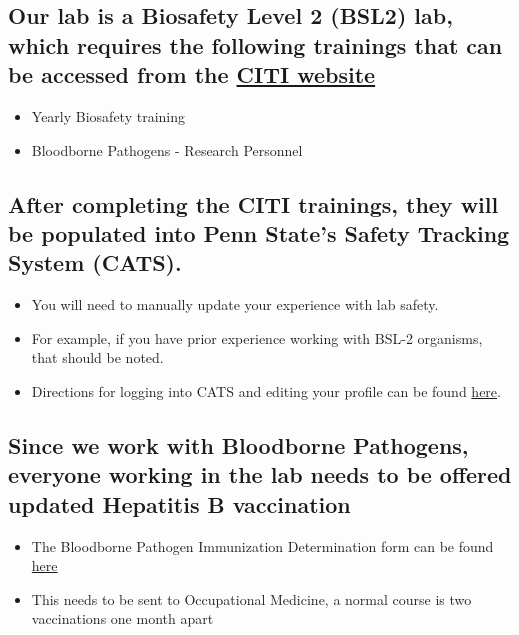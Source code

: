 \documentclass[
]{book}
\providecommand{\tightlist}{%
  \setlength{\itemsep}{0pt}\setlength{\parskip}{0pt}}
\begin{document}
\subsection{\texorpdfstring{Our lab is a Biosafety Level 2 (BSL2) lab, which requires the following trainings that can be accessed from the \href{https://citi.psu.edu/}{CITI website}}{Our lab is a Biosafety Level 2 (BSL2) lab, which requires the following trainings that can be accessed from the CITI website}}\label{our-lab-is-a-biosafety-level-2-bsl2-lab-which-requires-the-following-trainings-that-can-be-accessed-from-the-citi-website}

\begin{itemize}
\tightlist
\item
  Yearly Biosafety training
\item
  Bloodborne Pathogens - Research Personnel
\end{itemize}

\subsection{After completing the CITI trainings, they will be populated into Penn State's Safety Tracking System (CATS).}\label{after-completing-the-citi-trainings-they-will-be-populated-into-penn-states-safety-tracking-system-cats.}

\begin{itemize}
\tightlist
\item
  You will need to manually update your experience with lab safety.
\item
  For example, if you have prior experience working with BSL-2 organisms, that should be noted.
\item
  Directions for logging into CATS and editing your profile can be found \href{https://researchsupport.psu.edu/orp/ibc/events-training-resources/update-personnel-experience-in-cats-safety/}{here}.
\end{itemize}

\subsection{Since we work with Bloodborne Pathogens, everyone working in the lab needs to be offered updated Hepatitis B vaccination}\label{since-we-work-with-bloodborne-pathogens-everyone-working-in-the-lab-needs-to-be-offered-updated-hepatitis-b-vaccination}

\begin{itemize}
\tightlist
\item
  The Bloodborne Pathogen Immunization Determination form can be found \href{https://www.google.com/url?sa=t&source=web&rct=j&opi=89978449&url=https://ehs.psu.edu/sites/ehs/files/immunizationdetermination.doc&ved=2ahUKEwjktPLn3JuOAxVVKlkFHRmKLBgQFnoECBcQAQ&usg=AOvVaw1VFj5u8sX_YtMgqAmODOI2}{here}
\item
  This needs to be sent to Occupational Medicine, a normal course is two vaccinations one month apart
\end{itemize}
\end{document}
